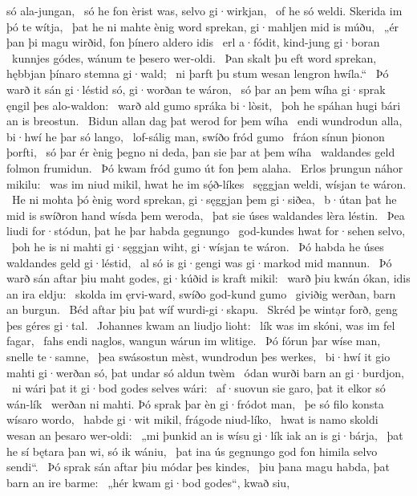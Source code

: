 só ala-jungan, \hld\ só he fon èrist was,
selvo gi·wirkjan, \hld\ of he só weldi.
Skerida im þó te wítja, \hld\ þat he ni mahte ènig word sprekan,
gi·mahljen mid is múðu, \hld\ „ér þan þi magu wirðid,
fon þínero aldero idis \hld\ erl a·fódit,
kind-jung gi·boran \hld\ kunnjes gódes,
wánum te þesero wer-oldi. \hld\ Þan skalt þu eft word sprekan,
hębbjan þínaro stemna gi·wald; \hld\ ni þarft þu stum wesan
lengron hwíla.“ \hld\ Þó warð it sán gi·léstid só,
gi·worðan te wáron, \hld\ só þar an þem wíha gi·sprak
ęngil þes alo-waldon: \hld\ warð ald gumo
spráka bi·lòsit, \hld\ þoh he spáhan hugi
bári an is breostun. \hld\ Bidun allan dag
þat werod for þem wíha \hld\ endi wundrodun alla,
bi·hwí he þar só lango, \hld\ lof-sálig man,
swíðo fród gumo \hld\ fráon sínun
þionon þorfti, \hld\ só þar ér ènig þegno ni deda,
þan sie þar at þem wíha \hld\ waldandes geld
folmon frumidun. \hld\ Þó kwam fród gumo
út fon þem alaha. \hld\ Erlos þrungun
náhor mikilu: \hld\ was im niud mikil,
hwat he im sǫ́ð-líkes \hld\ sęggjan weldi,
wísjan te wáron. \hld\ He ni mohta þó ènig word sprekan,
gi·sęggjan þem gi·siðea, \hld\ b·útan þat he mid is swíðron hand
wísda þem weroda, \hld\ þat sie úses waldandes
lèra léstin. \hld\ Þea liudi for·stódun,
þat he þar habda gegnungo \hld\ god-kundes hwat
for·sehen selvo, \hld\ þoh he is ni mahti gi·sęggjan wiht,
gi·wísjan te wáron. \hld\ Þó habda he úses waldandes
geld gi·léstid, \hld\ al só is gi·gengi was
gi·markod mid mannun. \hld\ Þó warð sán aftar þiu maht godes,
gi·kúðid is kraft mikil: \hld\ warð þiu kwán ókan,
idis an ira eldju: \hld\ skolda im ęrvi-ward,
swíðo god-kund gumo \hld\ giviðig werðan,
barn an burgun. \hld\ Béd aftar þiu
þat wíf wurdi-gi·skapu. \hld\ Skréd þe wintạr forð,
geng þes géres gi·tal. \hld\ Johannes kwam
an liudjo lioht: \hld\ lík was im skóni,
was im fel fagar, \hld\ fahs endi naglos,
wangun wárun im wlitige. \hld\ Þó fórun þar wíse man,
snelle te·samne, \hld\ þea swásostun mèst,
wundrodun þes werkes, \hld\ bi·hwí it gio mahti gi·werðan só,
þat undar só aldun twèm \hld\ ódan wurði
barn an gi·burdjon, \hld\ ni wári þat it gi·bod godes
selves wári: \hld\ af·suovun sie garo,
þat it elkor só wán-lík \hld\ werðan ni mahti.
Þó sprak þar èn gi·fródot man, \hld\ þe só filo konsta
wísaro wordo, \hld\ habde gi·wit mikil,
frágode niud-líko, \hld\ hwat is namo skoldi
wesan an þesaro wer-oldi: \hld\ „mi þunkid an is wísu gi·lík
iak an is gi·bárja, \hld\ þat he sí bętara þan wi,
só ik wániu, \hld\ þat ina ús gegnungo god fon himila
selvo sendi“. \hld\ Þó sprak sán aftar
þiu módar þes kindes, \hld\ þiu þana magu habda,
þat barn an ire barme: \hld\ „hér kwam gi·bod godes“, kwað siu,
